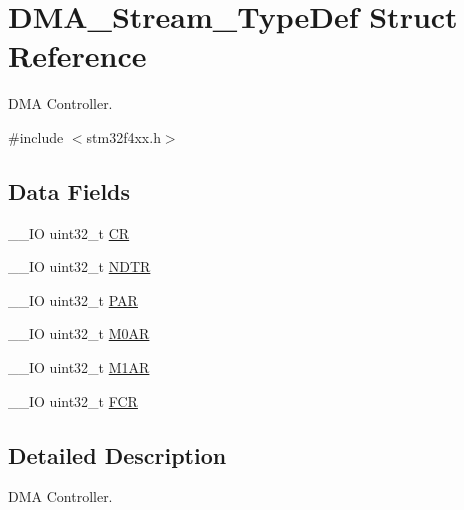 \hypertarget{struct_d_m_a___stream___type_def}{\section{D\-M\-A\-\_\-\-Stream\-\_\-\-Type\-Def Struct Reference}
\label{struct_d_m_a___stream___type_def}
}


D\-M\-A Controller.  




{\ttfamily \#include $<$stm32f4xx.\-h$>$}

\subsection*{Data Fields}
\begin{DoxyCompactItemize}
\item 
\-\_\-\-\_\-\-I\-O uint32\-\_\-t \hyperlink{struct_d_m_a___stream___type_def_ab40c89c59391aaa9d9a8ec011dd0907a}{C\-R}
\item 
\-\_\-\-\_\-\-I\-O uint32\-\_\-t \hyperlink{struct_d_m_a___stream___type_def_af60258ad5a25addc1e8969665d0c1731}{N\-D\-T\-R}
\item 
\-\_\-\-\_\-\-I\-O uint32\-\_\-t \hyperlink{struct_d_m_a___stream___type_def_aef55be3d948c22dd32a97e8d4f8761fd}{P\-A\-R}
\item 
\-\_\-\-\_\-\-I\-O uint32\-\_\-t \hyperlink{struct_d_m_a___stream___type_def_a63b4d166f4ab5024db6b493a7ab7b640}{M0\-A\-R}
\item 
\-\_\-\-\_\-\-I\-O uint32\-\_\-t \hyperlink{struct_d_m_a___stream___type_def_aee7782244ceb4791d9a3891804ac47ac}{M1\-A\-R}
\item 
\-\_\-\-\_\-\-I\-O uint32\-\_\-t \hyperlink{struct_d_m_a___stream___type_def_a5d5cc7f32884945503dd29f8f6cbb415}{F\-C\-R}
\end{DoxyCompactItemize}


\subsection{Detailed Description}
D\-M\-A Controller. 

